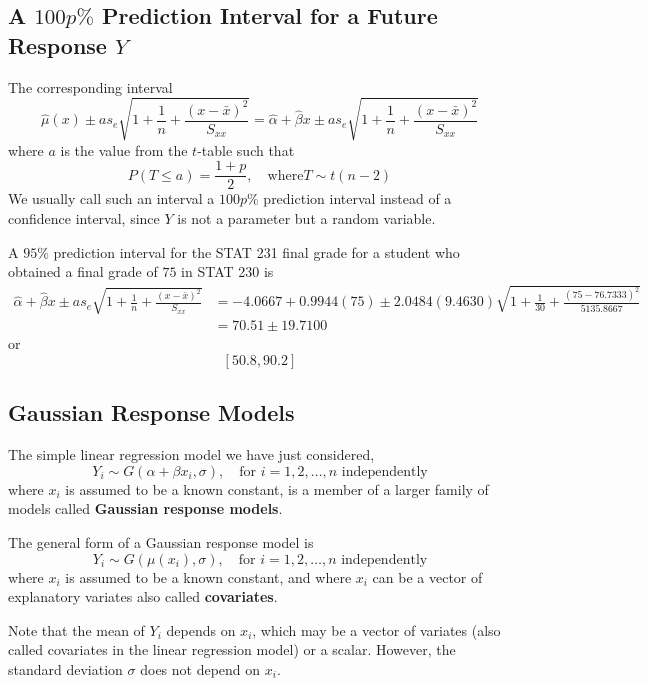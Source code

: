 \subsection{A $ 100p\% $ Prediction Interval for a Future Response $ Y $}
The corresponding interval
\[\hat{\mu}(x) \pm a s_{e} \sqrt{1+\frac{1}{n}+\frac{(x-\bar{x})^{2}}{S_{x x}}}=\hat{\alpha}+\hat{\beta} x \pm a s_{e} \sqrt{1+\frac{1}{n}+\frac{(x-\bar{x})^{2}}{S_{x x}}}\]
where $ a $ is the value from the $ t $-table such that
\[P(T \leq a)=\frac{1+p}{2}, \quad \text{where} T \sim t(n-2)\]
We usually call such an interval a $ 100p\% $ prediction interval instead of a confidence interval,
since $ Y $ is not a parameter but a random variable.

\begin{exbox}
    \begin{example}
        A $ 95\% $ prediction interval for the STAT 231 final grade for a student who obtained
        a final grade of $ 75 $ in STAT 230 is
        \begin{align*}
            \hat{\alpha}+\hat{\beta} x \pm a s_{e} \sqrt{1+\frac{1}{n}+\frac{(x-\bar{x})^{2}}{S_{x x}}}
             & =-4.0667+0.9944(75) \pm 2.0484(9.4630) \sqrt{1+\frac{1}{30}+\frac{(75-76.7333)^{2}}{5135.8667}} \\
             & =70.51 \pm 19.7100
        \end{align*}
        or
        \[ \left[ 50.8,90.2 \right] \]
    \end{example}
\end{exbox}

\subsection{Gaussian Response Models}
The simple linear regression model we have just considered,
\[ Y_i \sim G(\alpha+\beta x_i,\sigma),\quad \text{for } i=1,2, \ldots, n \text{ independently} \]
where $ x_i $ is assumed to be a known constant, is a member of a larger family of models
called \textbf{Gaussian response models}.

The general form of a Gaussian response model is
\[Y_{i} \sim G\left(\mu\left(x_{i}\right), \sigma\right), \quad \text{for } i=1,2, \ldots, n \text{ independently}\]
where $ x_i $ is assumed to be a known constant, and where $ x_i $ can be a vector of explanatory
variates also called \textbf{covariates}.

Note that the mean of $ Y_i $ depends on $ x_i $, which may be a vector of variates (also called
covariates in the linear regression model) or a scalar. However, the standard deviation $ \sigma $
does not depend on $ x_i $.

